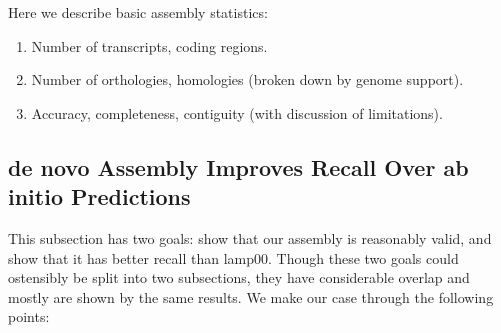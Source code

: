 \documentclass{article}
\begin{document}
Here we describe basic assembly statistics:

\begin{enumerate}

\item Number of transcripts, coding regions.
\item Number of orthologies, homologies (broken down by genome support).
\item Accuracy, completeness, contiguity (with discussion of limitations).

\end{enumerate}

\subsection*{de novo Assembly Improves Recall Over ab initio Predictions}

This subsection has two goals: show that our assembly is reasonably valid, and show that it has
better recall than lamp00. Though these two goals could ostensibly be split into two subsections, 
they have considerable overlap and mostly are shown by the same results. We make our case
through the following points:
\end{document}
